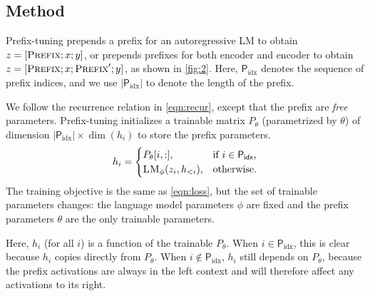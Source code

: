 \documentclass[11pt,a4paper]{article}
\newcommand{\exper}[1]{\textsc{#1}}
\newcommand{\LM}{\exper{LM}}
\newcommand{\prefix}{\exper{Prefix}}
\newcommand{\pp}{\textsf{P$_{\text{idx}}$}}
\newcommand{\PrefixMatrix}{P}
\newcommand\pl[1]{\textcolor{red}{[PL: #1]}}
\newcommand\lisa[1]{\textcolor{blue}{[Lisa: #1]}}
\begin{document}

\subsection{Method}
\label{ssec:formalmethod}
Prefix-tuning prepends a prefix for an autoregressive LM to obtain $z = [\prefix; x; y]$,  
or prepends prefixes for both encoder and encoder to obtain $z = [\prefix; x; \prefix'; y]$, as shown in \cref{fig:2}. Here, $\pp$ denotes the sequence of prefix indices, and we use $|\pp|$ to denote the length of the prefix. 

We follow the recurrence relation in \cref{eqn:recur}, except that the prefix are \emph{free} parameters. 
Prefix-tuning initializes a trainable matrix $\PrefixMatrix_\theta$ (parametrized by $\theta$) of dimension $|\pp| \times \dim(h_i)$ to store the prefix parameters.
\begin{align}
h_{i} = 
\begin{cases}
\PrefixMatrix_{\theta}[i,:],             & \text{if } i \in \pp \text{,}\\
\LM_\phi(z_i, h_{<i}),    	      & \text{otherwise.}
\end{cases}
\end{align}
The training objective is the same as \cref{eqn:loss}, but the set of trainable parameters changes: the language model parameters $\phi$ are fixed and the prefix parameters $\theta$ are the only trainable parameters. 

Here, $h_i$ (for all $i$) is a function of the trainable $\PrefixMatrix_\theta$. 
When $i \in \pp $, this is clear because $h_i$ copies directly from $\PrefixMatrix_{\theta}$. 
When $i \not \in  \pp $, $h_i$ still depends on $\PrefixMatrix_{\theta}$, because the prefix activations are always in the left context and will therefore affect any activations to its right. 
\end{document}
